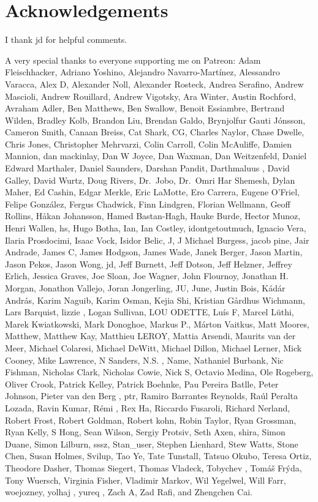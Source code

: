 \documentclass[
  letterpaper,
  DIV=11,
  numbers=noendperiod]{scrartcl}
\begin{document}
\section*{Acknowledgements}\label{acknowledgements}

I thank jd for helpful comments.

A very special thanks to everyone supporting me on Patreon: Adam
Fleischhacker, Adriano Yoshino, Alejandro Navarro-Martínez, Alessandro
Varacca, Alex D, Alexander Noll, Alexander Rosteck, Andrea Serafino,
Andrew Mascioli, Andrew Rouillard, Andrew Vigotsky, Ara Winter, Austin
Rochford, Avraham Adler, Ben Matthews, Ben Swallow, Benoit Essiambre,
Bertrand Wilden, Bradley Kolb, Brandon Liu, Brendan Galdo, Brynjolfur
Gauti Jónsson, Cameron Smith, Canaan Breiss, Cat Shark, CG, Charles
Naylor, Chase Dwelle, Chris Jones, Christopher Mehrvarzi, Colin Carroll,
Colin McAuliffe, Damien Mannion, dan mackinlay, Dan W Joyce, Dan Waxman,
Dan Weitzenfeld, Daniel Edward Marthaler, Daniel Saunders, Darshan
Pandit, Darthmaluus , David Galley, David Wurtz, Doug Rivers, Dr.~Jobo,
Dr.~Omri Har Shemesh, Dylan Maher, Ed Cashin, Edgar Merkle, Eric
LaMotte, Ero Carrera, Eugene O'Friel, Felipe González, Fergus Chadwick,
Finn Lindgren, Florian Wellmann, Geoff Rollins, Håkan Johansson, Hamed
Bastan-Hagh, Hauke Burde, Hector Munoz, Henri Wallen, hs, Hugo Botha,
Ian, Ian Costley, idontgetoutmuch, Ignacio Vera, Ilaria Prosdocimi,
Isaac Vock, Isidor Belic, J, J Michael Burgess, jacob pine, Jair
Andrade, James C, James Hodgson, James Wade, Janek Berger, Jason Martin,
Jason Pekos, Jason Wong, jd, Jeff Burnett, Jeff Dotson, Jeff Helzner,
Jeffrey Erlich, Jessica Graves, Joe Sloan, Joe Wagner, John Flournoy,
Jonathan H. Morgan, Jonathon Vallejo, Joran Jongerling, JU, June, Justin
Bois, Kádár András, Karim Naguib, Karim Osman, Kejia Shi, Kristian
Gårdhus Wichmann, Lars Barquist, lizzie , Logan Sullivan, LOU ODETTE,
Luís F, Marcel Lüthi, Marek Kwiatkowski, Mark Donoghoe, Markus P.,
Márton Vaitkus, Matt Moores, Matthew, Matthew Kay, Matthieu LEROY,
Mattia Arsendi, Maurits van der Meer, Michael Colaresi, Michael DeWitt,
Michael Dillon, Michael Lerner, Mick Cooney, Mike Lawrence, N Sanders,
N.S. , Name, Nathaniel Burbank, Nic Fishman, Nicholas Clark, Nicholas
Cowie, Nick S, Octavio Medina, Ole Rogeberg, Oliver Crook, Patrick
Kelley, Patrick Boehnke, Pau Pereira Batlle, Peter Johnson, Pieter van
den Berg , ptr, Ramiro Barrantes Reynolds, Raúl Peralta Lozada, Ravin
Kumar, Rémi , Rex Ha, Riccardo Fusaroli, Richard Nerland, Robert Frost,
Robert Goldman, Robert kohn, Robin Taylor, Ryan Grossman, Ryan Kelly, S
Hong, Sean Wilson, Sergiy Protsiv, Seth Axen, shira, Simon Duane, Simon
Lilburn, sssz, Stan\_user, Stephen Lienhard, Stew Watts, Stone Chen,
Susan Holmes, Svilup, Tao Ye, Tate Tunstall, Tatsuo Okubo, Teresa Ortiz,
Theodore Dasher, Thomas Siegert, Thomas Vladeck, Tobychev , Tomáš Frýda,
Tony Wuersch, Virginia Fisher, Vladimir Markov, Wil Yegelwel, Will Farr,
woejozney, yolhaj , yureq , Zach A, Zad Rafi, and Zhengchen Cai.
\end{document}
